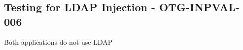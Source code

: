 \subsection{Testing for LDAP Injection - OTG-INPVAL-006}
Both applications do not use LDAP
\clearpage